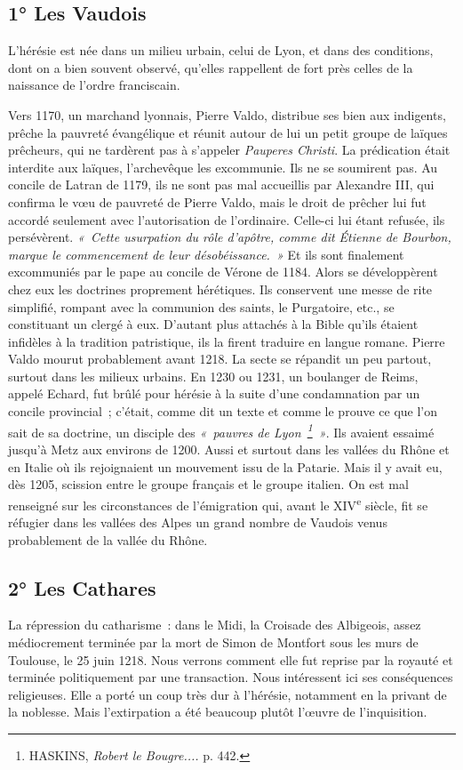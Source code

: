 \documentclass[french,twoside]{book} %
\begin{document}
\subsection[{1° Les Vaudois}]{1° Les Vaudois}
\noindent L’hérésie est née dans un milieu urbain, celui de Lyon, et dans des conditions, dont on a bien souvent observé, qu’elles rappellent de fort près celles de la naissance de l’ordre franciscain.\par
Vers 1170, un marchand lyonnais, Pierre Valdo, distribue ses bien aux indigents, prêche la pauvreté évangélique et réunit autour de lui un petit groupe de laïques prêcheurs, qui ne tardèrent pas à s’appeler {\itshape Pauperes Christi}. La prédication était interdite aux laïques, l’archevêque les excommunie. Ils ne se soumirent pas. Au concile de Latran de 1179, ils ne sont pas mal accueillis par Alexandre III, qui confirma le vœu de pauvreté de Pierre Valdo, mais le droit de prêcher lui fut accordé seulement avec l’autorisation de l’ordinaire. Celle-ci lui étant refusée, ils persévèrent. \emph{« Cette usurpation du rôle d’apôtre, comme dit Étienne de Bourbon, marque le commencement de leur désobéissance. »} Et ils sont finalement excommuniés par le pape au concile de Vérone de 1184. Alors se développèrent chez eux les doctrines proprement hérétiques. Ils conservent une messe de rite simplifié, rompant avec la communion des saints, le Purgatoire, etc., se constituant un clergé à eux. D’autant plus attachés à la Bible qu’ils étaient infidèles à la tradition patristique, ils la firent traduire en langue romane. Pierre Valdo mourut probablement avant 1218. La secte se répandit un peu partout, surtout dans les milieux urbains. En 1230 ou 1231, un boulanger de Reims, appelé Echard, fut brûlé pour hérésie à la suite d’une condamnation par un concile provincial ; c’était, comme dit un texte et comme le prouve ce que l’on sait de sa doctrine, un disciple des \emph{« pauvres de Lyon \footnote{ HASKINS, {\itshape Robert le Bougre....} p. 442.} »}. Ils avaient essaimé jusqu’à Metz aux environs de 1200. Aussi et surtout dans les vallées du Rhône et en Italie où ils rejoignaient un mouvement issu de la Patarie. Mais il y avait eu, dès 1205, scission entre le groupe français et le groupe italien. On est mal renseigné sur les circonstances de l’émigration qui, avant le XIV\textsuperscript{e} siècle, fit se réfugier dans les vallées des Alpes un grand nombre de Vaudois venus probablement de la vallée du Rhône.
\subsection[{2° Les Cathares }]{2° Les Cathares \protect\footnotemark }
\noindent La répression du catharisme : dans le Midi, la Croisade des Albigeois, assez médiocrement terminée par la mort de Simon de  
\label{p104} Montfort sous les murs de Toulouse, le 25 juin 1218. Nous verrons comment elle fut reprise par la royauté et terminée politiquement par une transaction. Nous intéressent ici ses conséquences religieuses. Elle a porté un coup très dur à l’hérésie, notamment en la privant de la noblesse. Mais l’extirpation a été beaucoup plutôt l’œuvre de l’inquisition.
\end{document}
